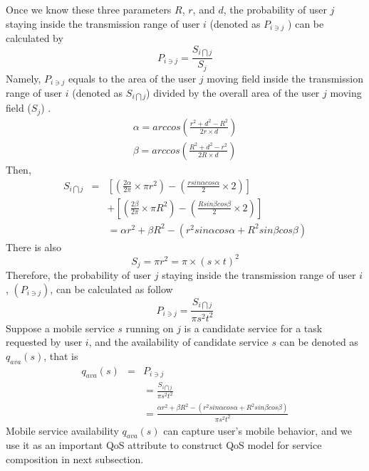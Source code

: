 \documentclass[10pt,journal,compsoc]{IEEEtran}
\begin{document}
​Once we know these three parameters $R$, $r$, and $d$, the probability of user $j$ staying inside the transmission range of user $i$ (denoted as $P_{i \ni j}$ ) can be calculated by
\begin{equation}
P_{i \ni j} = \frac{S_{i \bigcap j}}{S_j}
\end{equation}
Namely, $P_{i \ni j}$ equals to the area of the user $j$ moving field inside the transmission range of user $i$ (denoted as $S_{i \bigcap j}$) divided by the overall area of the user $j$ moving field ($S_j$) .
\begin{eqnarray}
\alpha = arccos(\frac{r^2+d^2-R^2}{2r\times d}) \\\nonumber
\beta = arccos(\frac{R^2+d^2-r^2}{2R\times d})
\end{eqnarray}
Then,
\setlength{\arraycolsep}{0.0em}
\begin{eqnarray}
S_{i \bigcap j}&{}={} & [(\frac{2\alpha}{2\pi} \times \pi r^2)-(\frac{r sin\alpha cos\alpha}{2} \times 2)]\\\nonumber
&&+[(\frac{2\beta}{2\pi} \times \pi R^2)-(\frac{R sin\beta cos\beta}{2} \times 2)]\\\nonumber
&&= \alpha r^2 + \beta R^2 - (r^2 sin\alpha cos\alpha + R^2 sin\beta cos\beta)
\end{eqnarray}
\setlength{\arraycolsep}{5pt}
There is also
\begin{equation}
S_j = \pi r^2 = \pi \times (s \times t)^2
\end{equation}
Therefore, the probability of user $j$ staying inside the transmission range of user $i$, $(P_{i \ni j})$, can be calculated as follow
\begin{equation}
P_{i \ni j} = \frac{S_{i \bigcap j}}{\pi s^2 t^2}
\end{equation}
Suppose a mobile service $s$ running on $j$ is a candidate service for a task requested by user $i$, and the availability of candidate service $s$ can be denoted as $q_{ava}(s)$, that is
\begin{eqnarray}
q_{ava}(s) &{} = {}& P_{i \ni j} \\\nonumber
&& = \frac{S_{i \bigcap j}}{\pi s^2 t^2}\\\nonumber
&& = \frac{\alpha r^2 + \beta R^2 - (r^2 sin\alpha cos\alpha + R^2 sin\beta cos\beta)}{\pi s^2 t^2}
\end{eqnarray}
Mobile service availability $q_{ava}(s)$ can capture user's mobile behavior, and we use it as an important QoS attribute to construct QoS model for service composition in next subsection.
\end{document}
